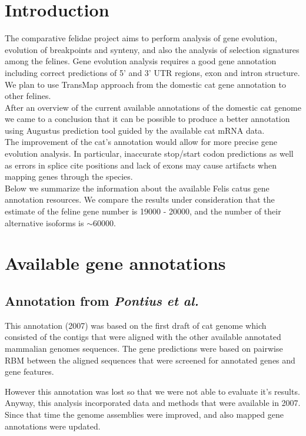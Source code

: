 \documentclass{article}
\begin{document}
\large
\centerline{}
\vspace*{20pt}
\section{Introduction}
The comparative felidae project aims to perform analysis of gene evolution, evolution of breakpoints and synteny, and also the analysis of selection signatures among the felines. Gene evolution analysis requires a good gene annotation including correct predictions of 5' and 3' UTR regions, exon and intron structure. 
We plan to use TransMap approach from the domestic cat gene annotation to other felines. \\
After an overview of the current available annotations of the domestic cat genome we came to a conclusion that it can be possible to produce a better annotation using Augustus prediction tool guided by the available cat mRNA data. \\
The improvement of the cat's annotation would allow for more precise gene evolution analysis.  In particular, inaccurate stop/start codon predictions as well as errors in splice cite positions and lack of exons may cause artifacts when mapping genes through the species.  \\
Below we summarize the information about the available Felis catus gene annotation resources. We compare the results under consideration that the estimate of the feline gene number is 19000 - 20000, and the number of their alternative isoforms is $\sim$60000.


\section{Available gene annotations}
\subsection{Annotation from \textit{Pontius et al.}}
This annotation (2007) was based on the first draft of cat genome which consisted of the contigs that were aligned with the other available annotated mammalian genomes sequences. The gene predictions were based on pairwise RBM between the aligned sequences that were screened for annotated genes and gene features.

However this annotation was lost so that we were not able to evaluate it’s results. Anyway, this analysis incorporated data and methods that were available in 2007. Since that time the genome assemblies were improved,  and also mapped gene annotations were updated.
\end{document}
